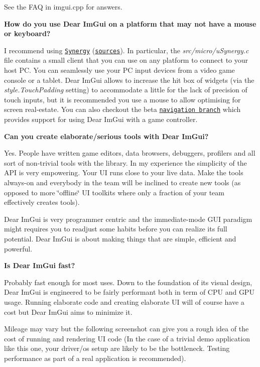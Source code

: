See the F\+AQ in imgui.\+cpp for answers.

{\bfseries How do you use Dear Im\+Gui on a platform that may not have a mouse or keyboard?}

I recommend using \href{http://synergy-project.org}{\tt Synergy} (\href{https://github.com/symless/synergy}{\tt sources}). In particular, the {\itshape src/micro/u\+Synergy.\+c} file contains a small client that you can use on any platform to connect to your host PC. You can seamlessly use your PC input devices from a video game console or a tablet. Dear Im\+Gui allows to increase the hit box of widgets (via the {\itshape style.\+Touch\+Padding} setting) to accommodate a little for the lack of precision of touch inputs, but it is recommended you use a mouse to allow optimising for screen real-\/estate. You can also checkout the beta \href{https://github.com/ocornut/imgui/tree/navigation}{\tt navigation branch} which provides support for using Dear Im\+Gui with a game controller.

{\bfseries Can you create elaborate/serious tools with Dear Im\+Gui?}

Yes. People have written game editors, data browsers, debuggers, profilers and all sort of non-\/trivial tools with the library. In my experience the simplicity of the A\+PI is very empowering. Your UI runs close to your live data. Make the tools always-\/on and everybody in the team will be inclined to create new tools (as opposed to more \char`\"{}offline\char`\"{} UI toolkits where only a fraction of your team effectively creates tools).

Dear Im\+Gui is very programmer centric and the immediate-\/mode G\+UI paradigm might requires you to readjust some habits before you can realize its full potential. Dear Im\+Gui is about making things that are simple, efficient and powerful.

{\bfseries Is Dear Im\+Gui fast?}

Probably fast enough for most uses. Down to the foundation of its visual design, Dear Im\+Gui is engineered to be fairly performant both in term of C\+PU and G\+PU usage. Running elaborate code and creating elaborate UI will of course have a cost but Dear Im\+Gui aims to minimize it.

Mileage may vary but the following screenshot can give you a rough idea of the cost of running and rendering UI code (In the case of a trivial demo application like this one, your driver/os setup are likely to be the bottleneck. Testing performance as part of a real application is recommended).



